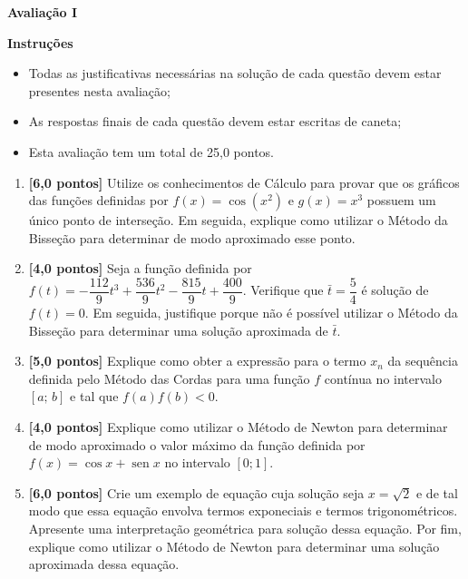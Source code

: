 \documentclass[12pt,a4paper]{article}
\DeclareMathOperator{\sen}{sen}
\begin{document}
\begin{center}
 \textbf{Avaliação I}
\end{center}

\textbf{Instruções}
\begin{itemize}
 \item Todas as justificativas necessárias na solução de cada questão devem estar presentes nesta avaliação;
 \item As respostas finais de cada questão devem estar escritas de caneta;
 \item Esta avaliação tem um total de 25,0 pontos.
\end{itemize}

\begin{enumerate}
 \item \textbf{[6,0 pontos]} Utilize os conhecimentos de Cálculo para provar que os gráficos das funções definidas por 
$f(x) = \cos\left(x^2\right)$ e $g(x) = x^3$ possuem um único ponto de interseção. Em seguida, 
explique como utilizar o Método da Bisseção para determinar de modo aproximado esse ponto.

 \item \textbf{[4,0 pontos]} Seja a função definida por $f(t) =  -\dfrac{112}{9}t^3 + \dfrac{536}{9}t^2 -\dfrac{815}{9}t + \dfrac{400}{9}$. Verifique que $\bar{t} = \dfrac{5}{4}$ é solução de $f(t) = 0$. 
Em seguida, justifique porque não é possível utilizar o Método da Bisseção para determinar uma solução aproximada de $\bar{t}$.
 
 \item \textbf{[5,0 pontos]} Explique como obter a expressão para o termo $x_n$ da sequência definida pelo Método das Cordas para uma função $f$ contínua no intervalo $[a;\,b]$ e tal que $f(a)f(b)<0$.

 \item \textbf{[4,0 pontos]} Explique como utilizar o Método de Newton para determinar de modo aproximado o valor máximo da função definida por $f(x) = \cos x + \sen x$ no intervalo $[0; 1]$.
 
 \item \textbf{[6,0 pontos]} Crie um exemplo de equação cuja solução seja $x = \sqrt{2}$ e de tal modo que essa equação envolva termos exponeciais e termos trigonométricos. 
 Apresente uma interpretação geométrica para solução dessa equação. Por fim, explique como utilizar o Método de Newton para determinar uma solução aproximada dessa equação.

\end{enumerate}
\end{document}
